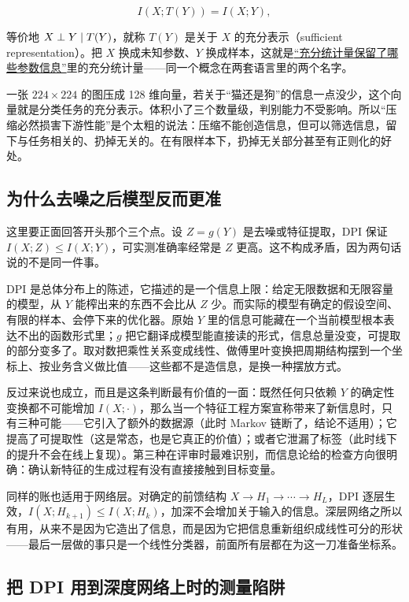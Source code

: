 \[
I(X;T(Y))=I(X;Y),
\]

等价地 \(X\perp Y\mid T(Y)\)，就称 \(T(Y)\) 是关于 \(X\) 的充分表示（sufficient representation）。把 \(X\) 换成未知参数、\(Y\) 换成样本，这就是\hyperref[sec:11-Mathematical-Statistics/03-Sufficient-Statistics-and-Information/01]{``充分统计量保留了哪些参数信息''}里的充分统计量——同一个概念在两套语言里的两个名字。

一张 \(224\times 224\) 的图压成 128 维向量，若关于``猫还是狗''的信息一点没少，这个向量就是分类任务的充分表示。体积小了三个数量级，判别能力不受影响。所以``压缩必然损害下游性能''是个太粗的说法：压缩不能创造信息，但可以筛选信息，留下与任务相关的、扔掉无关的。在有限样本下，扔掉无关部分甚至有正则化的好处。

\subsection{为什么去噪之后模型反而更准}

这里要正面回答开头那个三个点。设 \(Z=g(Y)\) 是去噪或特征提取，DPI 保证 \(I(X;Z)\le I(X;Y)\)，可实测准确率经常是 \(Z\) 更高。这不构成矛盾，因为两句话说的不是同一件事。

DPI 是总体分布上的陈述，它描述的是一个信息上限：给定无限数据和无限容量的模型，从 \(Y\) 能榨出来的东西不会比从 \(Z\) 少。而实际的模型有确定的假设空间、有限的样本、会停下来的优化器。原始 \(Y\) 里的信息可能藏在一个当前模型根本表达不出的函数形式里；\(g\) 把它翻译成模型能直接读的形式，信息总量没变，可提取的部分变多了。取对数把乘性关系变成线性、做傅里叶变换把周期结构摆到一个坐标上、按业务含义做比值——这些都不是造信息，是换一种摆放方式。

反过来说也成立，而且是这条判断最有价值的一面：既然任何只依赖 \(Y\) 的确定性变换都不可能增加 \(I(X;\cdot)\)，那么当一个特征工程方案宣称带来了新信息时，只有三种可能——它引入了额外的数据源（此时 Markov 链断了，结论不适用）；它提高了可提取性（这是常态，也是它真正的价值）；或者它泄漏了标签（此时线下的提升不会在线上复现）。第三种在评审时最难识别，而信息论给的检查方向很明确：确认新特征的生成过程有没有直接接触到目标变量。

同样的账也适用于网络层。对确定的前馈结构 \(X\to H_1\to\cdots\to H_L\)，DPI 逐层生效，\(I(X;H_{k+1})\le I(X;H_k)\)，加深不会增加关于输入的信息。深层网络之所以有用，从来不是因为它造出了信息，而是因为它把信息重新组织成线性可分的形状——最后一层做的事只是一个线性分类器，前面所有层都在为这一刀准备坐标系。

\subsection{把 DPI 用到深度网络上时的测量陷阱}

